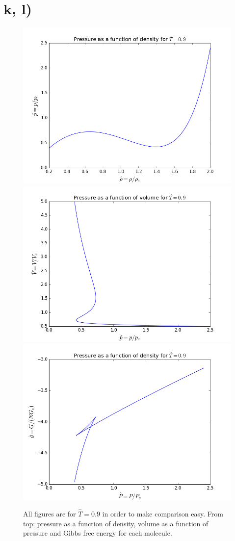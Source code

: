 \documentclass{article}
\begin{document}
\section*{k, l)}	
\begin{figure}
	\centering
	\includegraphics[width=0.644\linewidth]{figures/kdensity.png}	
	\includegraphics[width=0.644\linewidth]{figures/kvolume.png}
  	\includegraphics[width=0.644\linewidth]{figures/kgibbs.png}
  	\caption{All figures are for $\hat{T}=0.9$ in order to make comparison easy. From top: pressure as a function of density, volume as a function of pressure and Gibbs free energy for each molecule.}
  	\label{fig:gibbsfigure}
\end{figure}
\end{document}

